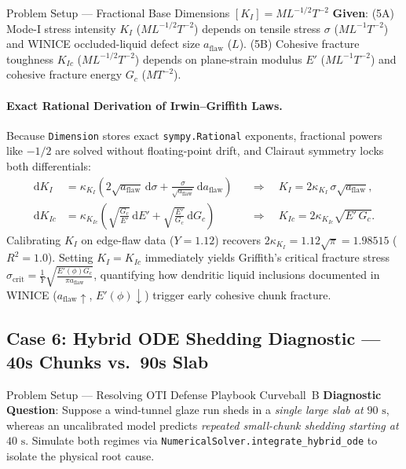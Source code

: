\documentclass[11pt,a4paper]{article}
\newcommand{\dd}{\mathrm{d}}
\newcommand{\dimbr}[1]{\left[#1\right]}
\begin{document}
\begin{setupbox}{Problem Setup — Fractional Base Dimensions $\dimbr{K_I} = M L^{-1/2} T^{-2}$}
\textbf{Given}: (5A) Mode-I stress intensity $K_I$ ($ML^{-1/2}T^{-2}$) depends on tensile stress $\sigma$ ($ML^{-1}T^{-2}$) and WINICE occluded-liquid defect size $a_{\text{flaw}}$ ($L$). (5B) Cohesive fracture toughness $K_{Ic}$ ($ML^{-1/2}T^{-2}$) depends on plane-strain modulus $E'$ ($ML^{-1}T^{-2}$) and cohesive fracture energy $G_c$ ($MT^{-2}$).
\end{setupbox}

\paragraph{Exact Rational Derivation of Irwin--Griffith Laws.}
Because \texttt{Dimension} stores exact \texttt{sympy.Rational} exponents, fractional powers like $-1/2$ are solved without floating-point drift, and Clairaut symmetry locks both differentials:
\begin{align}
  \dd K_I &= \kappa_{K_I}\!\left(2\sqrt{a_{\text{flaw}}}\,\dd\sigma + \frac{\sigma}{\sqrt{a_{\text{flaw}}}}\,\dd a_{\text{flaw}}\right)
  &&\Longrightarrow\quad K_I = 2\kappa_{K_I}\,\sigma\sqrt{a_{\text{flaw}}},\\[4pt]
  \dd K_{Ic} &= \kappa_{K_{Ic}}\!\left(\sqrt{\frac{G_c}{E'}}\,\dd E' + \sqrt{\frac{E'}{G_c}}\,\dd G_c\right)
  &&\Longrightarrow\quad K_{Ic} = 2\kappa_{K_{Ic}}\sqrt{E'\,G_c}.
\end{align}
Calibrating $K_I$ on edge-flaw data ($Y = 1.12$) recovers $2\kappa_{K_I} = 1.12\sqrt{\pi} = 1.98515$ ($R^2 = 1.0$). Setting $K_I = K_{Ic}$ immediately yields Griffith's critical fracture stress $\sigma_{\text{crit}} = \frac{1}{Y}\sqrt{\frac{E'(\phi) G_c}{\pi a_{\text{flaw}}}}$, quantifying how dendritic liquid inclusions documented in WINICE ($a_{\text{flaw}} \uparrow$, $E'(\phi) \downarrow$) trigger early cohesive chunk fracture.

\subsection{Case 6: Hybrid ODE Shedding Diagnostic — 40s Chunks vs.\ 90s Slab}

\begin{setupbox}{Problem Setup — Resolving OTI Defense Playbook Curveball~B}
\textbf{Diagnostic Question}: Suppose a wind-tunnel glaze run sheds in a \emph{single large slab at $90\text{ s}$}, whereas an uncalibrated model predicts \emph{repeated small-chunk shedding starting at $40\text{ s}$}. Simulate both regimes via \texttt{NumericalSolver.integrate\_hybrid\_ode} to isolate the physical root cause.
\end{setupbox}
\end{document}
